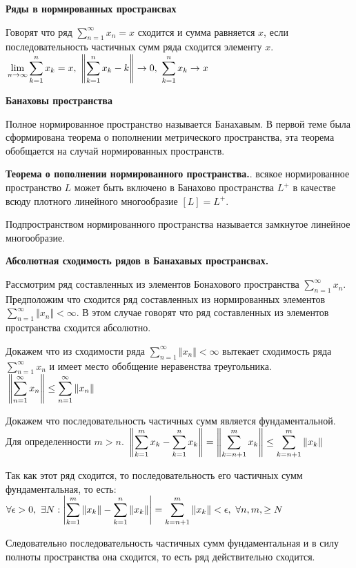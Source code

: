 \documentclass[12pt]{report}
\renewcommand{\[}{$\\\displaystyle}
\renewcommand{\]}{\\$}
\renewcommand{\[}{$\\\displaystyle}
\newcommand{\sep}{,\ }
\newcommand{\tth}[1][]{\textbf{Теорема#1.}}
\begin{document}
\textbf{Ряды в нормированных пространсвах}

Говорят что ряд $\sum_{n=1}^\infty x_n = x$ сходится и сумма равняется $x$, если последовательность частичных сумм ряда сходится элементу $x$.
\[\lim_{n \rightarrow \infty} \sum_{k=1}^n x_k = x \sep \left \Vert \sum_{k=1}^n x_k - k \right \Vert \rightarrow 0 \sep \sum_{k=1}^n x_k \rightarrow x\]

\textbf{Банаховы пространства}

Полное нормированное пространство называется Банахавым. В первой теме была сформирована теорема о пополнении метрического пространства, эта теорема обобщается на случай нормированных пространств.

\tth[ о пополнении нормированного пространства]. всякое нормированное пространство $L$ может быть включено в Банахово пространства $L^+$ в качестве всюду плотного линейного многообразие $[L]=L^+$.

Подпространством нормированного пространства называется замкнутое линейное многообразие.

\textbf{Абсолютная сходимость рядов в Банахавых пространсвах.}

Рассмотрим ряд составленных из элементов Бонахового пространства $\sum_{n=1}^\infty x_n$.
Предположим что сходится ряд составленных из нормированных элементов $\sum_{n=1}^\infty  \Vert x_n \Vert  < \infty$.
В этом случае говорят что ряд составленных из элементов пространства сходится абсолютно.

Докажем что из сходимости ряда $\sum_{n=1}^\infty  \Vert x_n \Vert  < \infty$ вытекает сходимость ряда $\sum_{n=1}^\infty x_n$ и имеет место обобщение неравенства треугольника.
\[ \left \Vert \sum_{n=1}^\infty x_n \right \Vert \leq \sum_{n=1}^\infty  \Vert x_n \Vert  \]

Докажем что последовательность частичных сумм является фундаментальной. Для определенности $m>n$.
\[ \left \Vert \sum_{k=1}^m x_k - \sum_{k=1}^n x_k \right \Vert  = \left \Vert \sum_{k=n+1}^m x_k \right \Vert  \leq \sum_{k=n+1}^m  \Vert x_k \Vert  \]

Так как этот ряд сходится, то последовательность его частичных сумм фундаментальная, то есть:
\[\forall \epsilon > 0 \sep \exists N: \left|\sum_{k=1}^m  \Vert x_k \Vert -\sum_{k=1}^n \Vert x_k \Vert \right| = \sum_{k=n+1}^m  \Vert x_k \Vert < \epsilon \sep \forall n,m, \geq N \]

Следовательно последовательность частичных сумм фундаментальная и в силу полноты пространства она сходится, то есть ряд действительно сходится.
\end{document}
